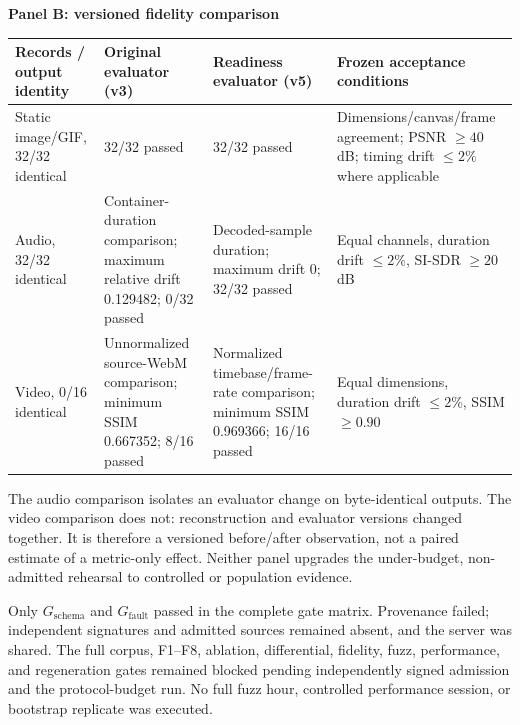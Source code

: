 \begin{table}[t]
\vspace{0.65ex}
\textbf{Panel B: versioned fidelity comparison}\\[-0.4ex]
\begin{tabularx}{\textwidth}{L{0.17\textwidth}L{0.29\textwidth}L{0.30\textwidth}Y}
\toprule
Records / output identity & Original evaluator (v3) & Readiness evaluator (v5) & Frozen acceptance conditions \\
\midrule
Static image/GIF, 32/32 identical & 32/32 passed & 32/32 passed & Dimensions/canvas/frame agreement; PSNR \(\ge40\) dB; timing drift \(\le2\%\) where applicable \\
Audio, 32/32 identical & Container-duration comparison; maximum relative drift 0.129482; 0/32 passed & Decoded-sample duration; maximum drift 0; 32/32 passed & Equal channels, duration drift \(\le2\%\), SI-SDR \(\ge20\) dB \\
Video, 0/16 identical & Unnormalized source-WebM comparison; minimum SSIM 0.667352; 8/16 passed & Normalized timebase/frame-rate comparison; minimum SSIM 0.969366; 16/16 passed & Equal dimensions, duration drift \(\le2\%\), SSIM \(\ge0.90\) \\
\bottomrule
\end{tabularx}
\endgroup
\end{table}

The audio comparison isolates an evaluator change on byte-identical outputs.
The video comparison does not: reconstruction and evaluator versions changed
together. It is therefore a versioned before/after observation, not a paired
estimate of a metric-only effect. Neither panel upgrades the under-budget,
non-admitted rehearsal to controlled or population evidence.

Only \(G_{\mathrm{schema}}\) and \(G_{\mathrm{fault}}\) passed in the complete
gate matrix. Provenance failed; independent signatures and admitted sources
remained absent, and the server was shared. The full corpus, F1--F8, ablation,
differential, fidelity, fuzz, performance, and regeneration gates remained
blocked pending independently signed admission and the protocol-budget run. No
full fuzz hour, controlled performance session, or bootstrap replicate was
executed.
